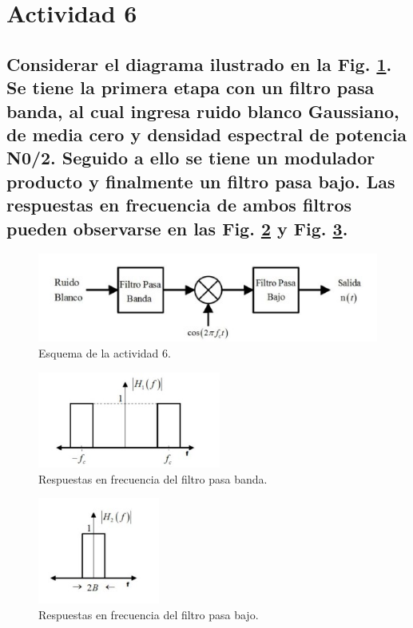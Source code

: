 \section{Actividad 6}

\subsection*{Considerar el diagrama ilustrado en la Fig. \ref{sistema}. Se tiene la primera etapa con un filtro pasa banda, al cual
ingresa ruido blanco Gaussiano, de media cero y densidad espectral de potencia N0/2. Seguido a ello se tiene un modulador producto y 
finalmente un filtro pasa bajo. Las respuestas en frecuencia de ambos filtros pueden observarse en las Fig. \ref{pasabanda} y
Fig. \ref{pasabajo}.}


	\begin{figure}[H]
		\centering
		\includegraphics[width=12cm]{imagenes/Actividad_6/act_6_sistema.jpg}
		\caption{Esquema de la actividad 6.}
		\label{sistema}
	\end{figure}

	\begin{figure}[H]
		\centering
		\includegraphics[width=6cm]{imagenes/Actividad_6/act6_pasabanda.jpg}
		\caption{Respuestas en frecuencia del filtro pasa banda.}
		\label{pasabanda}
	\end{figure}

	\begin{figure}[H]
		\centering
		\includegraphics[width=4cm]{imagenes/Actividad_6/act_6_pbajos.jpg}
		\caption{Respuestas en frecuencia del filtro pasa bajo.}
		\label{pasabajo}
	\end{figure}



